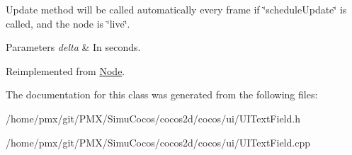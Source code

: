 Update method will be called automatically every frame if \char`\"{}schedule\+Update\char`\"{} is called, and the node is \char`\"{}live\char`\"{}. 
\begin{DoxyParams}{Parameters}
{\em delta} & In seconds. \\
\hline
\end{DoxyParams}


Reimplemented from \hyperlink{classNode_a32878481ba54b3856ab53c10af13848e}{Node}.



The documentation for this class was generated from the following files\+:\begin{DoxyCompactItemize}
\item 
/home/pmx/git/\+P\+M\+X/\+Simu\+Cocos/cocos2d/cocos/ui/U\+I\+Text\+Field.\+h\item 
/home/pmx/git/\+P\+M\+X/\+Simu\+Cocos/cocos2d/cocos/ui/U\+I\+Text\+Field.\+cpp\end{DoxyCompactItemize}
